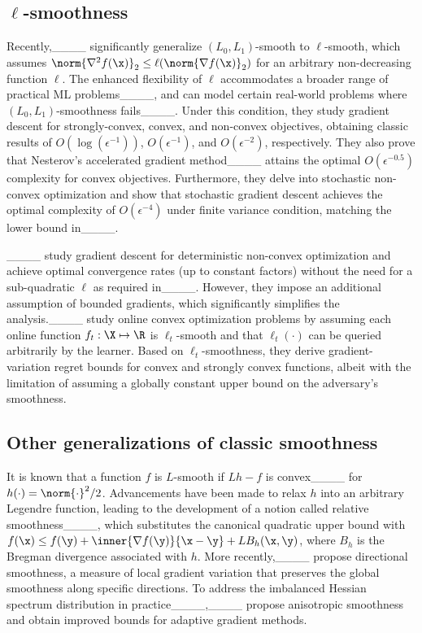 \subsection{$\ell$-smoothness}
Recently,____ significantly generalize $(L_0,L_1)$-smooth to $\ell$-smooth, which assumes $\norm{\nabla^2 f(\x)}_2\le \ell(\norm{\nabla f(\x)}_2)$ for an arbitrary non-decreasing function $\ell$. The enhanced flexibility of $\ell$ accommodates a broader range of practical ML problems____, and can model certain real-world problems where $(L_0,L_1)$-smoothness fails____. Under this condition, they study gradient descent for strongly-convex, convex, and non-convex objectives, obtaining classic results of $O(\log(\epsilon^{-1}))$, $O(\epsilon^{-1})$, and $O(\epsilon^{-2})$, respectively. They also prove that Nesterov's accelerated gradient method____ attains the optimal $O(\epsilon^{-0.5})$ complexity for convex objectives. Furthermore, they delve into stochastic non-convex optimization and show that stochastic gradient descent achieves the optimal complexity of $O(\epsilon^{-4})$ under finite variance condition, matching the lower bound in____.
\setParDis

____ study gradient descent for deterministic non-convex optimization and achieve optimal convergence rates (up to constant factors) without the need for a sub-quadratic \(\ell\) as required in____. However, they impose an additional assumption of bounded gradients, which significantly simplifies the analysis.____ study online convex optimization problems by assuming each online function $f_t:\X\mapsto\R$ is $\ell_t$-smooth and that $\ell_t(\cdot)$ can be queried arbitrarily by the learner. Based on $\ell_t$-smoothness, they derive gradient-variation regret bounds for convex and strongly convex functions, albeit with the limitation of assuming a globally constant upper bound on the adversary's smoothness. 

\subsection{Other generalizations of classic smoothness}
It is known that a function $f$ is $L$-smooth if $Lh-f$ is convex____ for $h(\cdot)=\norm{\cdot}^2/2$. Advancements have been made to relax $h$ into an arbitrary Legendre function, leading to the development of a notion called relative smoothness____, which substitutes the canonical quadratic upper bound with $f(\x)\le f(\y)+\inner{\nabla f(\y)}{\x-\y}+LB_h(\x,\y)$, where $B_h$ is the Bregman divergence associated with $h$. More recently,____ propose directional smoothness, a measure of local gradient variation that preserves the global smoothness along specific directions. To address the imbalanced Hessian spectrum distribution in practice____,____ propose anisotropic smoothness and obtain improved bounds for adaptive gradient methods.
